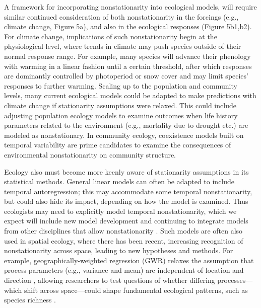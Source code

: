\documentclass[11pt,a4paper,oneside]{article}
\begin{document}
A framework for incorporating nonstationarity into ecological models, will require similar continued consideration of both nonstationarity in the forcings (e.g., climate change, Figure 5a), and also in the ecological responses (Figure 5b1,b2). For climate change, implications of such nonstationarity begin at the physiological level, where trends in climate may push species outside of their normal response range. For example, many species will advance their phenology with warming in a linear fashion until a certain threshold, after which responses are dominantly controlled by photoperiod or snow cover \citep{Iler2013} and may limit species' responses to further warming. Scaling up to the population and community levels, many current ecological models could be adapted to make predictions with climate change if stationarity assumptions were relaxed. This could include adjusting population ecology models to examine outcomes when life history parameters related to the environment (e.g., mortality due to drought etc.) are modeled as nonstationary. In community ecology, coexistence models built on temporal variability \citep[e.g.,][]{Chesson:1997dz} are prime candidates to examine the consequences of environmental nonstationarity on community structure. 

Ecology also must become more keenly aware of stationarity assumptions in its statistical methods. General linear models can often be adapted to include temporal autoregression; this may accommodate some temporal nonstationarity, but could also hide its impact, depending on how the model is examined. Thus ecologists may need to explicitly model temporal nonstationarity, which we expect will include new model development and continuing to integrate models from other disciplines that allow nonstationarity   \citep[e.g,][]{Grenfell:2001ox,lipp2002}. Such models are often also used in spatial ecology, where there has been recent, increasing recognition of nonstationarity across space, leading to new hypotheses and methods. For example, geographically-weighted regression (GWR) relaxes the assumption that process parameters (e.g., variance and mean) are independent of location and direction \citep{Brunsdon:1998nx}, allowing researchers to test questions of whether differing processes---which shift across space---could shape fundamental ecological patterns, such as species richness \citep{davies2011}.\\  %
\end{document}
